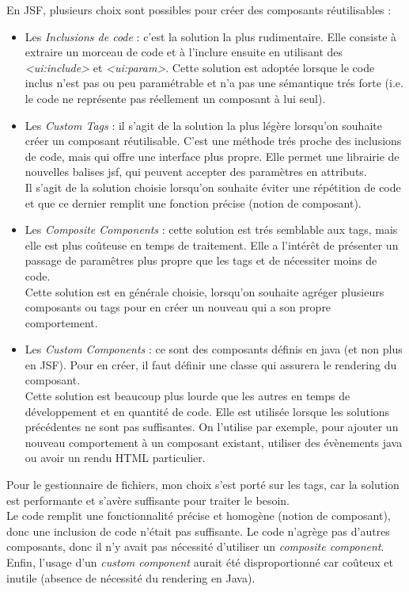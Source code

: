En JSF, plusieurs choix sont possibles pour créer des composants réutilisables : 
\begin{itemize}
\item Les \textit{Inclusions de code} : c'est la solution la plus rudimentaire. Elle consiste à extraire un morceau de code et à l'inclure ensuite en utilisant des \textit{<ui:include>} et \textit{<ui:param>}. Cette solution est adoptée lorsque le code inclus n'est pas ou peu paramétrable et n'a pas une sémantique trés forte (i.e. le code ne représente pas réellement un composant à lui seul).
\item Les \textit{Custom Tags} : il s'agit de la solution la plus légère lorsqu'on souhaite créer un composant réutilisable. C'est une méthode trés proche des inclusions de code, mais qui offre une interface plus propre. Elle permet une librairie de nouvelles balises jsf, qui peuvent accepter des paramètres en attributs. \\
Il s'agit de la solution choisie lorsqu'on souhaite éviter une répétition de code et que ce dernier remplit une fonction précise (notion de composant).
\item Les \textit{Composite Components\cite{bib:compositeComponent}} : cette solution est trés semblable aux tags, mais elle est plus coûteuse en temps de traitement. Elle a l'intérêt de présenter un passage de paramêtres plus propre que les tags et de nécessiter moins de code.\\
Cette solution est en générale choisie, lorsqu'on souhaite agréger plusieurs composants ou tags pour en créer un nouveau qui a son propre comportement.
\item Les \textit{Custom Components} : ce sont des composants définis en java (et non plus en JSF). Pour en créer, il faut définir une classe qui assurera le rendering du composant.\\
Cette solution est beaucoup plus lourde que les autres en temps de développement et en quantité de code. Elle est utilisée lorsque les solutions précédentes ne sont pas suffisantes. On l'utilise par exemple, pour ajouter un nouveau comportement à un composant existant, utiliser des évènements java ou avoir un rendu HTML particulier. 
\end{itemize}

Pour le gestionnaire de fichiers, mon choix s'est porté sur les tags, car la solution est performante et s'avère suffisante pour traiter le besoin.\\
Le code remplit une fonctionnalité précise et homogène (notion de composant), donc une inclusion de code n'était pas suffisante. Le code n'agrège pas d'autres composants, donc il n'y avait pas nécessité d'utiliser un \textit{composite component}. Enfin, l'usage d'un \textit{custom component} aurait été disproportionné car coûteux et inutile (absence de nécessité du rendering en Java).

